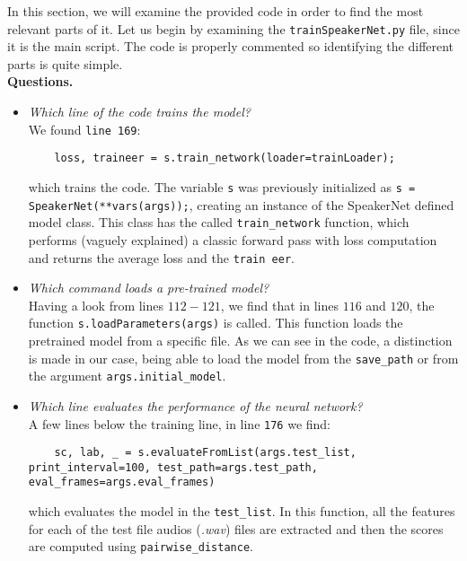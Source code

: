 \documentclass[a4paper]{article}
\def\inline{\lstinline[basicstyle=\ttfamily,keywordstyle={}]}
\begin{document}
In this section, we will examine the provided code in order to find the most relevant parts of it. Let us begin by examining the \inline{trainSpeakerNet.py} file, since it is the main script. The code is properly commented so identifying the different parts is quite simple.\\

\textbf{Questions.}\\

\begin{itemize}
  \item \emph{Which line of the code trains the model?}\\

        We found \inline{line 169}:
        \begin{verbatim}
    loss, traineer = s.train_network(loader=trainLoader);
  \end{verbatim}
        which trains the code. The variable \inline{s} was previously initialized as \inline{s = SpeakerNet(**vars(args));}, creating an instance of the SpeakerNet defined model class. This class has the called \inline{train_network} function, which performs (vaguely explained) a classic forward pass with loss computation and returns the average loss and the \inline{train eer}.

  \item \emph{Which command loads a pre-trained model?}\\

        Having a look from lines \(112-121\), we find that in lines \(116\) and \(120\), the function \inline{s.loadParameters(args)} is called. This function loads the pretrained model from a specific file. As we can see in the code, a distinction is made in our case, being able to load the model from the \inline{save_path} or from the argument \inline{args.initial_model}.
  \item \emph{Which line evaluates the performance of the neural network?}\\

        A few lines below the training line, in line \inline{176} we find:
        \begin{verbatim}
    sc, lab, _ = s.evaluateFromList(args.test_list, print_interval=100, test_path=args.test_path, eval_frames=args.eval_frames)
  \end{verbatim}
        which evaluates the model in the \inline{test_list}. In this function, all the features for each of the test file audios (\emph{.wav}) files are extracted and then the scores are computed using \inline{pairwise_distance}.


\end{itemize}
\end{document}
